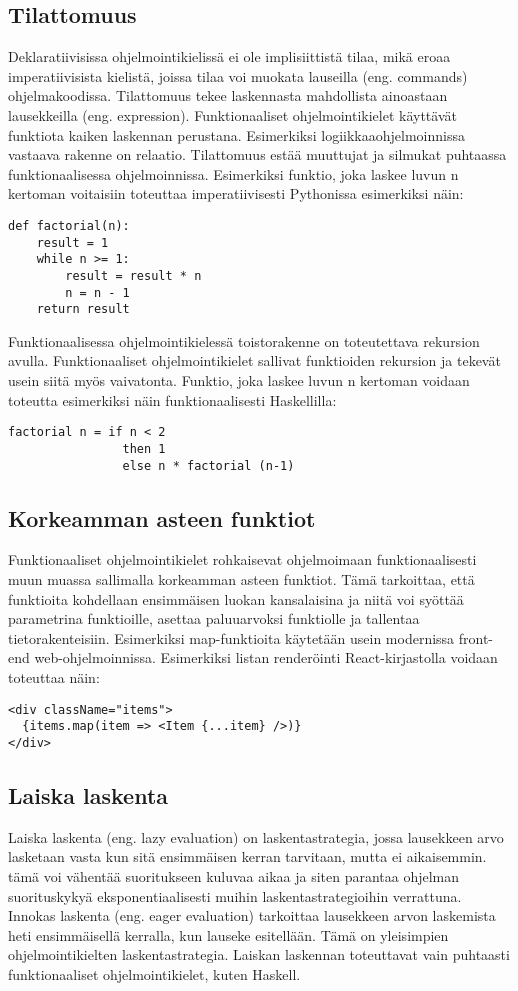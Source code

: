 \subsection{Tilattomuus}
Deklaratiivisissa ohjelmointikielissä ei ole implisiittistä tilaa, mikä eroaa imperatiivisista kielistä, joissa tilaa
voi muokata lauseilla (eng. commands) ohjelmakoodissa. Tilattomuus tekee laskennasta mahdollista ainoastaan lausekkeilla
(eng. expression). Funktionaaliset ohjelmointikielet käyttävät funktiota kaiken laskennan perustana. Esimerkiksi
logiikkaaohjelmoinnissa vastaava rakenne on relaatio. Tilattomuus estää muuttujat ja silmukat puhtaassa
funktionaalisessa ohjelmoinnissa. Esimerkiksi funktio, joka laskee luvun n kertoman voitaisiin toteuttaa
imperatiivisesti Pythonissa esimerkiksi näin:
\begin{verbatim}
def factorial(n):
    result = 1
    while n >= 1:
        result = result * n
        n = n - 1
    return result
\end{verbatim}
Funktionaalisessa ohjelmointikielessä toistorakenne on toteutettava rekursion avulla. Funktionaaliset ohjelmointikielet
sallivat funktioiden rekursion ja tekevät usein siitä myös vaivatonta.\cite{hudak} Funktio, joka laskee luvun n kertoman
voidaan toteutta esimerkiksi näin funktionaalisesti Haskellilla:
\begin{verbatim}
factorial n = if n < 2
                then 1
                else n * factorial (n-1)
\end{verbatim}

\subsection{Korkeamman asteen funktiot}
Funktionaaliset ohjelmointikielet rohkaisevat ohjelmoimaan funktionaalisesti muun muassa sallimalla korkeamman asteen
funktiot. Tämä tarkoittaa, että funktioita kohdellaan ensimmäisen luokan kansalaisina ja niitä voi syöttää parametrina
funktioille, asettaa paluuarvoksi funktiolle ja tallentaa tietorakenteisiin.\cite{hudak} Esimerkiksi map-funktioita
käytetään usein modernissa front-end web-ohjelmoinnissa. Esimerkiksi listan renderöinti React-kirjastolla voidaan
toteuttaa näin:
\begin{verbatim}
<div className="items">
  {items.map(item => <Item {...item} />)}
</div>
\end{verbatim}

\subsection{Laiska laskenta}
Laiska laskenta (eng. lazy evaluation) on laskentastrategia, jossa lausekkeen arvo lasketaan vasta kun sitä ensimmäisen
kerran tarvitaan, mutta ei aikaisemmin. tämä voi vähentää suoritukseen kuluvaa aikaa ja siten parantaa ohjelman
suorituskykyä eksponentiaalisesti muihin laskentastrategioihin verrattuna. Innokas laskenta (eng. eager evaluation)
tarkoittaa lausekkeen arvon laskemista heti ensimmäisellä kerralla, kun lauseke esitellään. Tämä on yleisimpien
ohjelmointikielten laskentastrategia. Laiskan laskennan toteuttavat vain puhtaasti funktionaaliset ohjelmointikielet,
kuten Haskell.\cite{languagedesign}

